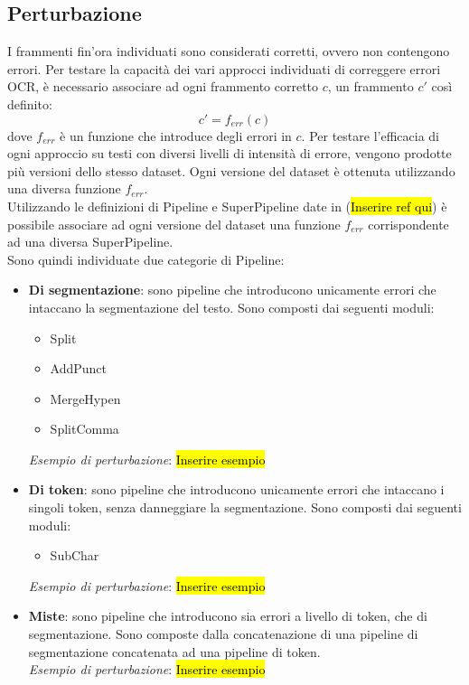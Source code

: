 \documentclass[12pt]{article}
\begin{document}
\subsection{Perturbazione} \label{sec:perturbazione}
I frammenti fin'ora individuati sono considerati corretti, ovvero non contengono errori. Per testare la capacità dei vari approcci individuati di correggere errori OCR, è necessario associare ad ogni frammento corretto $c$, un frammento $c'$ così definito:
\begin{equation}
c' = f_{err}(c)
\end{equation}
dove $f_{err}$ è un funzione che introduce degli errori in $c$.
Per testare l'efficacia di ogni approccio su testi con diversi livelli di intensità di errore, vengono prodotte più versioni dello stesso dataset. Ogni versione del dataset è ottenuta utilizzando una diversa funzione $f_{err}$.\\
Utilizzando le definizioni di Pipeline e SuperPipeline date in (\hl{Inserire ref qui}) è possibile associare ad ogni versione del dataset una funzione $f_{err}$ corrispondente ad una diversa SuperPipeline.\\
Sono quindi individuate due categorie di Pipeline:
\begin{itemize}
\item \textbf{Di segmentazione}: sono pipeline che introducono unicamente errori che intaccano la segmentazione del testo. Sono composti dai seguenti moduli:
	\begin{itemize}
	\item Split
	\item AddPunct
	\item MergeHypen
	\item SplitComma
	\end{itemize}
	\textit{Esempio di perturbazione}: \hl{Inserire esempio}
\item \textbf{Di token}: sono pipeline che introducono unicamente errori che intaccano i singoli token, senza danneggiare la segmentazione. Sono composti dai seguenti moduli:
	\begin{itemize}
	\item SubChar
	\end{itemize}
	\textit{Esempio di perturbazione}: \hl{Inserire esempio}
\item \textbf{Miste}: sono pipeline che introducono sia errori a livello di token, che di segmentazione. Sono composte dalla concatenazione di una pipeline di segmentazione concatenata ad una pipeline di token.\\
	\textit{Esempio di perturbazione}: \hl{Inserire esempio}
\end{itemize}
\end{document}
